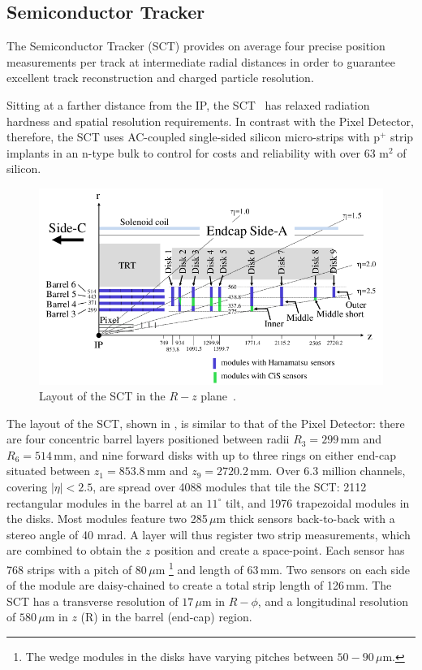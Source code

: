 %
\subsection{Semiconductor Tracker}

The Semiconductor Tracker (SCT) provides on average four precise position measurements per track at intermediate radial distances in order to guarantee excellent track reconstruction and charged particle \pt resolution.

Sitting at a farther distance from the IP, the SCT~\cite{SCT_paper} has relaxed radiation hardness and spatial resolution requirements. In contrast with the Pixel Detector, therefore, the SCT uses AC-coupled single-sided silicon micro-strips with p$^+$ strip implants in an n-type bulk to control for costs and reliability with over 63 m$^2$ of silicon. 

\begin{figure}[tbp]
\begin{center}
\includegraphics[width=.9\linewidth]{figures/ATLAS/SCT_Quadrant}
\caption[Semiconductor Tracker layout]{Layout of the SCT in the $R-z$ plane~\cite{SCT_paper}.}
\label{fig:sct_layout}
\end{center}
\end{figure}

The layout of the SCT, shown in \Fig{\ref{fig:sct_layout}}, is similar to that of the Pixel Detector: there are four concentric barrel layers
positioned between radii $R_3=299$\,mm and $R_6=514$\,mm, and nine forward disks with up to three rings on either end-cap situated between $z_1=853.8$\,mm and $z_9=2720.2$\,mm. Over 6.3 million channels, covering $|\eta|<2.5$, are spread over 4088 modules that tile the SCT: 2112 rectangular modules in the barrel at an $11^{\circ}$ tilt, and 1976 trapezoidal modules in the disks. Most modules feature two 285\,$\mu$m thick sensors back-to-back with a stereo angle of 40 mrad. A layer will thus register two strip measurements, which are combined to obtain the $z$ position and create a space-point. Each sensor has 768 strips with a pitch of 80\,$\mu$m
\footnote{The wedge modules in the disks have varying pitches between $50-90\,\mu$m.} 
and length of 63\,mm. Two sensors on each side of the module are daisy-chained to create a total strip length of 126\,mm.  The SCT has a transverse resolution of $17\,\mu$m in $R-\phi$, and a longitudinal resolution of $580\,\mu$m in $z$ (R) in the barrel (end-cap) region.



